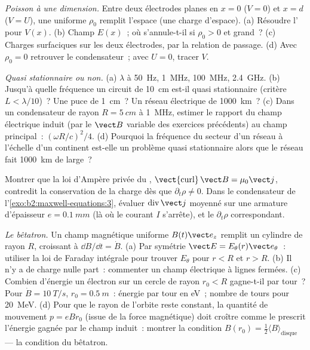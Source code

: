 \begin{exercise}[$\star\star$]\label{exo:b2:maxwell-equations:7}
\emph{Poisson à une dimension.} Entre deux électrodes planes en $x = 0$
($V = 0$) et $x = d$ ($V = U$), une  uniforme $\rho_0$ remplit
l'espace (une charge d'espace). (a) Résoudre l' pour $V(x)$. (b) Champ
$E(x)$~; où s'annule-t-il si $\rho_0 > 0$ et grand~? (c) Charges surfaciques sur
les deux électrodes, par la relation de passage. (d) Avec $\rho_0 = 0$
retrouver le condensateur~; avec $U = 0$, tracer $V$.
\end{exercise}

\begin{exercise}[$\star\star$]\label{exo:b2:maxwell-equations:8}
\emph{Quasi stationnaire ou non.} (a) $\lambda$ à \qty{50}{Hz}, \qty{1}{MHz},
\qty{100}{MHz}, \qty{2.4}{GHz}. (b) Jusqu'à quelle fréquence un circuit de \qty{10}{cm}
est-il quasi stationnaire (critère $L < \lambda/10$)~? Une puce de \qty{1}{cm}~? Un
réseau électrique de \qty{1000}{km}~? (c) Dans un condensateur de rayon $R = \qty{5}{cm}$ à
\qty{1}{MHz}, estimer le rapport du champ électrique induit (par le
$\vect B$ variable des exercices précédents) au champ principal~: $(\omega R/c)^2
/4$. (d) Pourquoi la fréquence du secteur d'un réseau à l'échelle d'un continent est-elle un
problème quasi stationnaire alors que le réseau fait \qty{1000}{km} de large~?
\end{exercise}

\begin{exercise}[$\star\star$]\label{exo:b2:maxwell-equations:9}
Montrer que la loi d'Ampère privée du , $\operatorname{\vect{curl}}
\vect B = \mu_0\vect j$, contredit la conservation de la charge dès que $\partial_t\rho
\ne 0$. Dans le condensateur de l'\cref{exo:b2:maxwell-equations:3}, évaluer
$\operatorname{div}\vect j$ moyenné sur une armature d'épaisseur $e = \qty{0.1}{mm}$
(là où le courant $I$ s'arrête), et le $\partial_t\rho$ correspondant.
\end{exercise}

\begin{exercise}[$\star\star\star$]\label{exo:b2:maxwell-equations:10}
\emph{Le bêtatron.} Un champ magnétique uniforme $B(t)\vect e_z$ remplit un
cylindre de rayon $R$, croissant à $\dd B/\dd t = \dot B$. (a) Par symétrie
$\vect E = E_\theta(r)\vect e_\theta$~: utiliser la loi de Faraday intégrale pour trouver $E_\theta$
pour $r < R$ et $r > R$. (b) Il n'y a de charge nulle part~: commenter un
champ électrique à lignes fermées. (c) Combien d'énergie un électron sur un cercle de
rayon $r_0 < R$ gagne-t-il par tour~? Pour $\dot B = \qty{10}{T/s}$,
$r_0 = \qty{0.5}{m}$~: énergie par tour en eV~; nombre de tours pour \qty{20}{MeV}.
(d) Pour que le rayon de l'orbite reste constant, la quantité de mouvement $p = eBr_0$ (issue
de la force magnétique) doit croître comme le prescrit l'énergie gagnée par le champ induit~:
montrer la condition $B(r_0) = \tfrac12\langle B\rangle_{\text{disque}}$
--- la condition du bêtatron.
\end{exercise}

